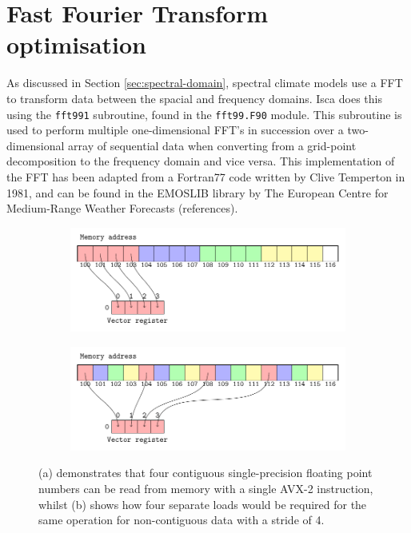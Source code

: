 \documentclass[a4paper,11pt]{report}
\begin{document}
\section[FFT optimisation]{Fast Fourier Transform optimisation}
As discussed in Section \ref{sec:spectral-domain}, spectral climate models use a FFT to transform data between the spacial and frequency domains. Isca does this using the \texttt{fft991} subroutine, found in the \texttt{fft99.F90} module. This subroutine is used to perform multiple one-dimensional FFT's in succession over a two-dimensional array of sequential data when converting from a grid-point decomposition to the frequency domain and vice versa. This implementation of the FFT has been adapted from a Fortran77 code written by Clive Temperton in 1981, and can be found in the EMOSLIB library by The European Centre for Medium-Range Weather Forecasts (references).
\par
\begin{figure}[htbp]
\centering
\begin{subfigure}[b]{1\textwidth}
   \includegraphics[width=1\linewidth]{img/tikz-img/vector_registers_contiguous/vector_registers.pdf}
   \caption{}
   \label{fig:Ng1} 
\end{subfigure}

\begin{subfigure}[b]{1\textwidth}
   \includegraphics[width=1\linewidth]{img/tikz-img/vector_registers_noncontiguous/vector_registers.pdf}
   \caption{}
   \label{fig:Ng2}
\end{subfigure}

\caption[Contiguous and non-contiguous memory access]{ (a) demonstrates that four contiguous single-precision floating point numbers can be read from memory with a single AVX-2 instruction, whilst (b) shows how four separate loads would be required for the same operation for non-contiguous data with a stride of 4.}
\label{fig:vector-registers}
\end{figure}
\end{document}
